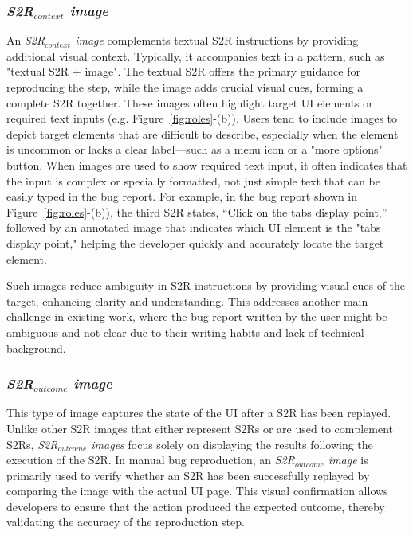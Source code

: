 \subsubsection{
\textbf{\textit{S2R$_{context}$ image}}} 
An \textit{S2R$_{context}$ image}  complements textual S2R instructions by providing additional visual context. 
Typically, it accompanies text in a pattern, such as "textual S2R + image". 
The textual S2R offers the primary guidance for reproducing the step, while the image adds crucial visual cues, forming a complete S2R together. 
%
These images often highlight target UI elements or required text inputs (e.g. Figure~\ref{fig:roles}-(b)).
%
Users tend to include images to depict target elements that are difficult to describe, especially when the element is uncommon or lacks a clear label—such as a menu icon or a "more options" button. 
%
When images are used to show required text input, it often indicates that the input is complex or specially formatted, not just simple text that can be easily typed in the bug report.
%
For example, in the bug report shown in Figure~\ref{fig:roles}-(b)), the third S2R states, “Click on the tabs display point,” followed by an annotated image that indicates which UI element is the "tabs display point," helping the developer quickly and accurately locate the target element. %

Such images reduce ambiguity in S2R instructions by providing visual cues of the target, enhancing clarity and understanding. This addresses another main challenge in existing work, where the bug report written by the user might be ambiguous and not clear due to their writing habits and lack of technical background.


\subsubsection{
\textbf{\textit{S2R$_{outcome}$ image}}} 
This type of image captures the state of the UI after a S2R has been replayed.  Unlike other S2R images that either represent S2Rs or are used to complement S2Rs, \textit{S2R$_{outcome}$ images} focus solely on displaying the results following the execution of the S2R.
%
In manual bug reproduction, an \textit{S2R$_{outcome}$ image} is primarily used to verify whether an S2R has been successfully replayed by comparing the image with the actual UI page. This visual confirmation allows developers to ensure that the action produced the expected outcome, thereby validating the accuracy of the reproduction step.
%

